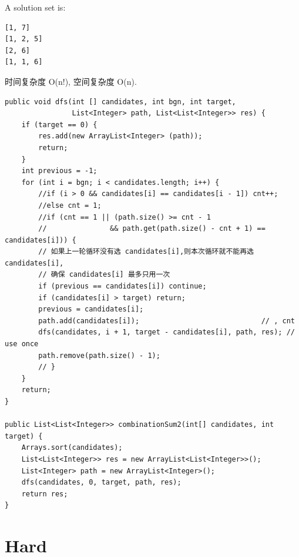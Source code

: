 \documentclass[12pt]{book}
\begin{document}
A solution set is: 
\lstset{language=java,label= ,caption= ,numbers=none}
\begin{lstlisting}
[1, 7] 
[1, 2, 5] 
[2, 6] 
[1, 1, 6]
\end{lstlisting}

时间复杂度 O(n!), 空间复杂度 O(n). 

\lstset{language=java,label= ,caption= ,numbers=none}
\begin{lstlisting}
public void dfs(int [] candidates, int bgn, int target,
                List<Integer> path, List<List<Integer>> res) {
    if (target == 0) {
        res.add(new ArrayList<Integer> (path));
        return;
    }
    int previous = -1;
    for (int i = bgn; i < candidates.length; i++) {
        //if (i > 0 && candidates[i] == candidates[i - 1]) cnt++;
        //else cnt = 1;
        //if (cnt == 1 || (path.size() >= cnt - 1
        //               && path.get(path.size() - cnt + 1) == candidates[i])) {
        // 如果上一轮循环没有选 candidates[i],则本次循环就不能再选 candidates[i],
        // 确保 candidates[i] 最多只用一次
        if (previous == candidates[i]) continue;
        if (candidates[i] > target) return;
        previous = candidates[i];
        path.add(candidates[i]);                             // , cnt
        dfs(candidates, i + 1, target - candidates[i], path, res); // use once
        path.remove(path.size() - 1);
        // }
    }
    return;
}

public List<List<Integer>> combinationSum2(int[] candidates, int target) {
    Arrays.sort(candidates); 
    List<List<Integer>> res = new ArrayList<List<Integer>>();
    List<Integer> path = new ArrayList<Integer>();
    dfs(candidates, 0, target, path, res);
    return res;
}
\end{lstlisting}

\section{Hard}
\label{sec-11-2}
\end{document}
